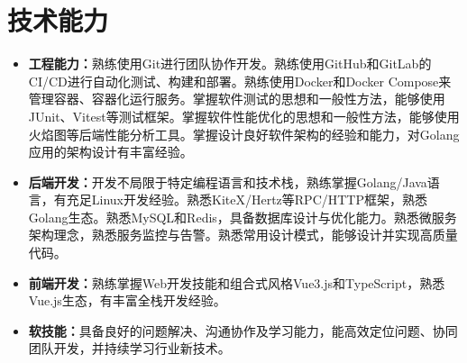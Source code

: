 \documentclass{style/template}
\begin{document}
\section{技术能力}

\begin{itemize}
    \item \textbf{工程能力：}熟练使用Git进行团队协作开发。熟练使用GitHub和GitLab的CI/CD进行自动化测试、构建和部署。熟练使用Docker和Docker Compose来管理容器、容器化运行服务。掌握软件测试的思想和一般性方法，能够使用JUnit、Vitest等测试框架。掌握软件性能优化的思想和一般性方法，能够使用火焰图等后端性能分析工具。掌握设计良好软件架构的经验和能力，对Golang应用的架构设计有丰富经验。
    \item \textbf{后端开发：}开发不局限于特定编程语言和技术栈，熟练掌握Golang/Java语言，有充足Linux开发经验。熟悉KiteX/Hertz等RPC/HTTP框架，熟悉Golang生态。熟悉MySQL和Redis，具备数据库设计与优化能力。熟悉微服务架构理念，熟悉服务监控与告警。熟悉常用设计模式，能够设计并实现高质量代码。
    \item \textbf{前端开发：}熟练掌握Web开发技能和组合式风格Vue3.js和TypeScript，熟悉Vue.js生态，有丰富全栈开发经验。
    \item \textbf{软技能：}具备良好的问题解决、沟通协作及学习能力，能高效定位问题、协同团队开发，并持续学习行业新技术。
\end{itemize}
\end{document}
